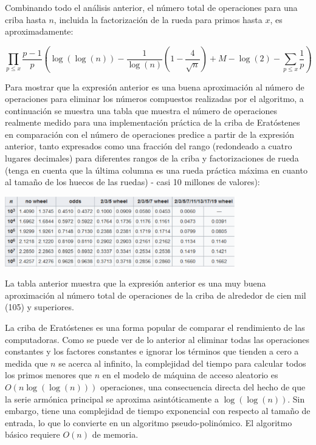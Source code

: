 \documentclass[12pt]{article}
\newcommand{\nl}{\vspace{0.3cm}}
\begin{document}
\nl

Combinando todo el análisis anterior, el número total de operaciones para una criba hasta $n$, incluida la factorización de la rueda para primos hasta $x$, es aproximadamente:

$$ \prod_{p \leqslant x}\frac{p - 1}{p} \left( \log(\log(n)) - \frac{1}{\log(n)} \left(1  -\frac{4}{\sqrt{n}}\right) + M - \log(2) - \sum_{p \leqslant x}\frac{1}{p} \right) $$

Para mostrar que la expresión anterior es una buena aproximación al número de operaciones para eliminar los números compuestos realizadas por el algoritmo, a continuación se muestra una tabla que muestra el número de operaciones realmente medido para una implementación práctica de la criba de Eratóstenes en comparación con el número de operaciones predice a partir de la expresión anterior, tanto expresados como una fracción del rango (redondeado a cuatro lugares decimales) para diferentes rangos de la criba y factorizaciones de rueda (tenga en cuenta que la última columna es una rueda práctica máxima en cuanto al tamaño de los huecos de las ruedas) - casi 10 millones de valores):

\begin{center}
	\includegraphics[width=10cm]{images/table1.png}
\end{center}

La tabla anterior muestra que la expresión anterior es una muy buena aproximación al número total de operaciones de la criba de alrededor de cien mil (105) y superiores.

\nl

La criba de Eratóstenes es una forma popular de comparar el rendimiento de las computadoras. \cite{ompts} Como se puede ver de lo anterior al eliminar todas las operaciones constantes y los factores constantes e ignorar los términos que tienden a cero a medida que $n$ se acerca al infinito, la complejidad del tiempo para calcular todos los primos menores que $n$ en el modelo de máquina de acceso aleatorio es $O(n\log(\log(n)))$ operaciones, una consecuencia directa del hecho de que la serie armónica principal se aproxima asintóticamente a $\log(\log(n))$. Sin embargo, tiene una complejidad de tiempo exponencial con respecto al tamaño de entrada, lo que lo convierte en un algoritmo pseudo-polinómico. El algoritmo básico requiere $O(n)$ de memoria.
\end{document}
